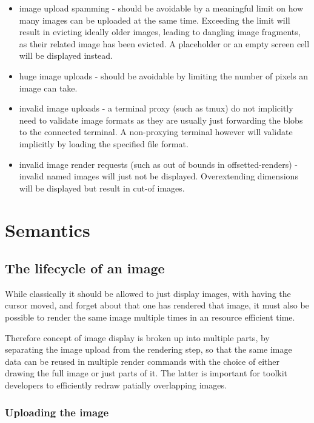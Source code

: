 \documentclass[a4paper]{article}
\begin{document}
\begin{itemize}
    \item image upload spamming - should be avoidable by a meaningful limit
        on how many images can be uploaded at the same time.
        Exceeding the limit will result in evicting ideally older images,
        leading to dangling image fragments, as their related image has been
        evicted. A placeholder or an empty screen cell will be displayed instead.
    \item huge image uploads - should be avoidable by limiting the number
        of pixels an image can take.
    \item invalid image uploads - a terminal proxy (such as tmux) do not
        implicitly need to validate image formats as they are usually just
        forwarding the blobs to the connected terminal. A non-proxying
        terminal however will validate implicitly by loading the specified
        file format.
    \item invalid image render requests (such as out of bounds in offsetted-renders) -
        invalid named images will just not be displayed.
        Overextending dimensions will be displayed but result in cut-of images.
\end{itemize}

\section{Semantics} %
\subsection{The lifecycle of an image} %

While classically it should be allowed to just display images,
with having the cursor moved, and forget about that one has rendered that
image, it must also be possible to render the same image multiple times
in an resource efficient time.

Therefore concept of image display is broken up into multiple parts,
by separating the image upload from the rendering step, so
that the same image data can be reused in multiple render commands with
the choice of either drawing the full image or just parts of it.
The latter is important for toolkit developers to efficiently redraw
patially overlapping images.

\subsubsection*{Uploading the image} %
\end{document}
